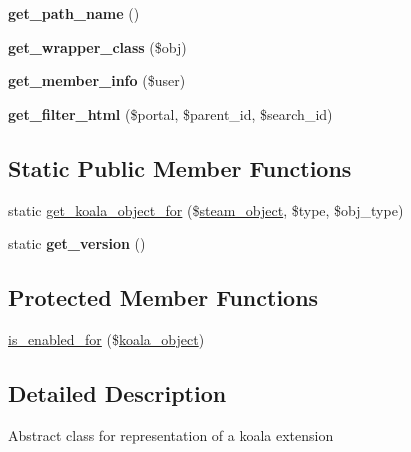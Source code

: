 \begin{DoxyCompactItemize}
\item 
\hypertarget{classkoala__extension_a96c22366034319820f54e671c7bddaa7}{
{\bfseries get\_\-path\_\-name} ()}
\label{classkoala__extension_a96c22366034319820f54e671c7bddaa7}

\item 
\hypertarget{classkoala__extension_a042771b27e89dee63127559952a582d5}{
{\bfseries get\_\-wrapper\_\-class} (\$obj)}
\label{classkoala__extension_a042771b27e89dee63127559952a582d5}

\item 
\hypertarget{classkoala__extension_a5c3fa5af994eeb725be86e33bf195260}{
{\bfseries get\_\-member\_\-info} (\$user)}
\label{classkoala__extension_a5c3fa5af994eeb725be86e33bf195260}

\item 
\hypertarget{classkoala__extension_a3128d19e82b79ff2c760f2a5faf0608a}{
{\bfseries get\_\-filter\_\-html} (\$portal, \$parent\_\-id, \$search\_\-id)}
\label{classkoala__extension_a3128d19e82b79ff2c760f2a5faf0608a}

\end{DoxyCompactItemize}
\subsection*{Static Public Member Functions}
\begin{DoxyCompactItemize}
\item 
static \hyperlink{classkoala__extension_a306865f507b7f7f40471f337d9050c2d}{get\_\-koala\_\-object\_\-for} (\$\hyperlink{classsteam__object}{steam\_\-object}, \$type, \$obj\_\-type)
\item 
\hypertarget{classkoala__extension_aea4bbdb77480d223289f90e9a30ebab7}{
static {\bfseries get\_\-version} ()}
\label{classkoala__extension_aea4bbdb77480d223289f90e9a30ebab7}

\end{DoxyCompactItemize}
\subsection*{Protected Member Functions}
\begin{DoxyCompactItemize}
\item 
\hyperlink{classkoala__extension_a5a7f41ac1cda63072ccd9462930e4977}{is\_\-enabled\_\-for} (\$\hyperlink{classkoala__object}{koala\_\-object})
\end{DoxyCompactItemize}


\subsection{Detailed Description}
Abstract class for representation of a koala extension 

